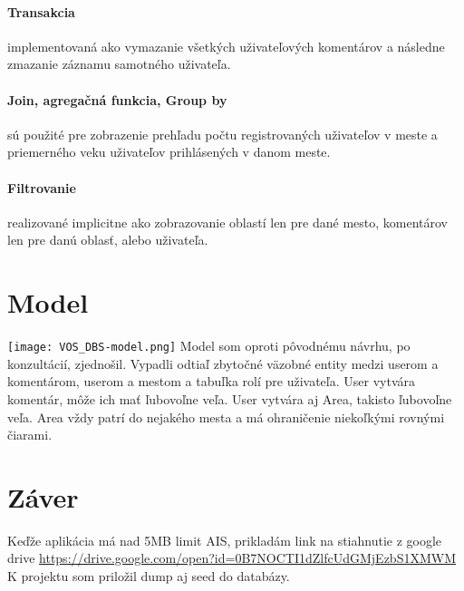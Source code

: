 \documentclass[12pt,oneside,slovak,a4paper]{article}
\begin{document}
\paragraph{Transakcia} implementovaná ako vymazanie všetkých uživateľových komentárov a následne zmazanie záznamu samotného uživateľa.
\paragraph{Join, agregačná funkcia, Group by} sú použité pre zobrazenie prehľadu počtu registrovaných uživateľov v meste a priemerného veku uživateľov prihlásených v danom meste.
\paragraph{Filtrovanie} realizované implicitne ako zobrazovanie oblastí len pre dané mesto, komentárov len pre danú oblasť, alebo uživateľa.

\section{Model}
\texttt{[image: VOS\_DBS-model.png]}
Model som oproti pôvodnému návrhu, po konzultácií, zjednošil. Vypadli odtiaľ zbytočné väzobné entity medzi userom a komentárom, userom a mestom a tabuľka rolí pre uživateľa. User vytvára komentár, môže ich mať ľubovoľne veľa. User vytvára aj Area, takisto ľubovoľne veľa. Area vždy patrí do nejakého mesta a má ohraničenie niekoľkými rovnými čiarami.

\section{Záver}
Keďže aplikácia má nad 5MB limit AIS, prikladám link na stiahnutie z google drive \url{https://drive.google.com/open?id=0B7NOCTI1dZlfcUdGMjEzbS1XMWM}
K projektu som priložil dump aj seed do databázy.
\end{document}

